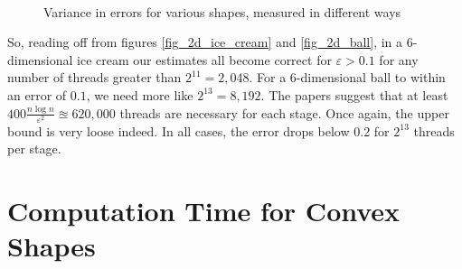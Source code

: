 \begin{figure}
\centering
{}
\\

\caption{Variance in errors for various shapes, measured in different ways}
\label{fig_histograms}
\end{figure}


So, reading off from figures \ref{fig_2d_ice_cream} and \ref{fig_2d_ball}, in a 6-dimensional ice cream our estimates all become correct for $\varepsilon > 0.1$ for any number of threads greater than $2^11 = 2,048$. For a 6-dimensional ball to within an error of $0.1$, we need more like $2^{13} = 8,192$. The papers suggest that at least $400\frac{n\log n}{\varepsilon^2} \approxeq 620,000$ threads are necessary for each stage. Once again, the upper bound is very loose indeed. In all cases, the error drops below $0.2$ for $2^{13}$ threads per stage.

\section{Computation Time for Convex Shapes}\label{sec_time}

